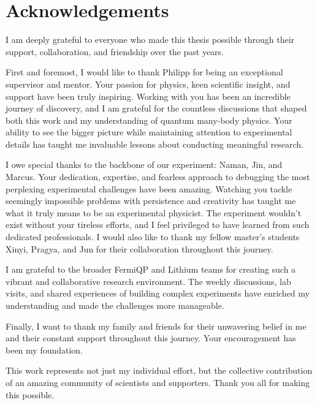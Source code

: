 
\thispagestyle{plain}

\section*{Acknowledgements}



I am deeply grateful to everyone who made this thesis possible through their support, collaboration, and friendship over the past years.

First and foremost, I would like to thank Philipp for being an exceptional supervisor and mentor. Your passion for physics, keen scientific insight, and support have been truly inspiring. Working with you has been an incredible journey of discovery, and I am grateful for the countless discussions that shaped both this work and my understanding of quantum many-body physics. Your ability to see the bigger picture while maintaining attention to experimental details has taught me invaluable lessons about conducting meaningful research.

I owe special thanks to the backbone of our experiment: Naman, Jin, and Marcus. Your dedication, expertise, and fearless approach to debugging the most perplexing experimental challenges have been amazing. Watching you tackle seemingly impossible problems with persistence and creativity has taught me what it truly means to be an experimental physicist. The experiment wouldn't exist without your tireless efforts, and I feel privileged to have learned from such dedicated professionals. I would also like to thank my fellow master's students Xinyi, Pragya, and Jun for their collaboration throughout this journey.

I am grateful to the broader FermiQP and Lithium teams for creating such a vibrant and collaborative research environment. The weekly discussions, lab visits, and shared experiences of building complex experiments have enriched my understanding and made the challenges more manageable.

Finally, I want to thank my family and friends for their unwavering belief in me and their constant support throughout this journey. Your encouragement has been my foundation.

This work represents not just my individual effort, but the collective contribution of an amazing community of scientists and supporters. Thank you all for making this possible.